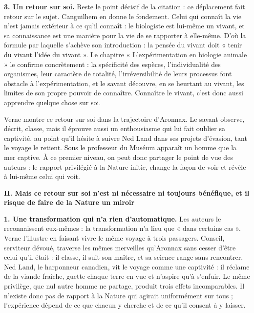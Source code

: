 \documentclass[11pt,a4paper]{article}
\begin{document}
\textbf{3. Un retour sur soi.} Reste le point décisif de la citation : ce déplacement fait retour sur le sujet. Canguilhem en donne le fondement. Celui qui connaît la vie n'est jamais extérieur à ce qu'il connaît : le biologiste est lui-même un vivant, et sa connaissance est une manière pour la vie de se rapporter à elle-même. D'où la formule par laquelle s'achève son introduction : la pensée du vivant doit « tenir du vivant l'idée du vivant ». Le chapitre « L'expérimentation en biologie animale » le confirme concrètement : la spécificité des espèces, l'individualité des organismes, leur caractère de totalité, l'irréversibilité de leurs processus font obstacle à l'expérimentation, et le savant découvre, en se heurtant au vivant, les limites de son propre pouvoir de connaître. Connaître le vivant, c'est donc aussi apprendre quelque chose sur soi.

Verne montre ce retour sur soi dans la trajectoire d'Aronnax. Le savant observe, décrit, classe, mais il éprouve aussi un enthousiasme qui lui fait oublier sa captivité, au point qu'il hésite à suivre Ned Land dans ses projets d'évasion, tant le voyage le retient. Sous le professeur du Muséum apparaît un homme que la mer captive. À ce premier niveau, on peut donc partager le point de vue des auteurs : le rapport privilégié à la Nature initie, change la façon de voir et révèle à lui-même celui qui voit.

\textbf{II. Mais ce retour sur soi n'est ni nécessaire ni toujours bénéfique, et il risque de faire de la Nature un miroir}

\textbf{1. Une transformation qui n'a rien d'automatique.} Les auteurs le reconnaissent eux-mêmes : la transformation n'a lieu que « dans certains cas ». Verne l'illustre en faisant vivre le même voyage à trois passagers. Conseil, serviteur dévoué, traverse les mêmes merveilles qu'Aronnax sans cesser d'être celui qu'il était : il classe, il suit son maître, et sa science range sans rencontrer. Ned Land, le harponneur canadien, vit le voyage comme une captivité : il réclame de la viande fraîche, guette chaque terre en vue et n'aspire qu'à s'enfuir. Le même privilège, que nul autre homme ne partage, produit trois effets incomparables. Il n'existe donc pas de rapport à la Nature qui agirait uniformément sur tous ; l'expérience dépend de ce que chacun y cherche et de ce qu'il consent à y laisser.
\end{document}

